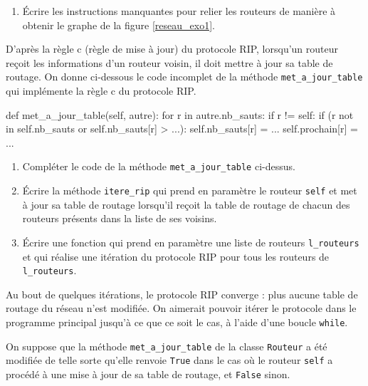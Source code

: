         \begin{enumerate}[series=monDS, resume]
\item Écrire les instructions manquantes pour relier les routeurs de manière à obtenir le graphe de la figure \ref{reseau_exo1}.



\end{enumerate}

D’après la règle c (règle de mise à jour) du protocole RIP, lorsqu’un routeur reçoit les informations d’un routeur voisin, il doit mettre à jour sa table de routage. On donne ci-dessous le code incomplet de la méthode \verb|met_a_jour_table| qui implémente la règle c du protocole RIP.

    \begin{CodePythontexAlt}[TaillePolice=\large, Largeur=1\linewidth,Centre,Lignes=true,PremLigne=1]{}
def met_a_jour_table(self, autre): 
    for r in autre.nb_sauts: 
        if r != self: 
            if (r not in self.nb_sauts or self.nb_sauts[r] > ...): 
                self.nb_sauts[r] = ... 
                self.prochain[r] = ...
\end{CodePythontexAlt}

\begin{enumerate}[series=monDS, resume]
    \item Compléter le code de la méthode \verb|met_a_jour_table| ci-dessus.
    
\medskip
    \item Écrire la méthode \verb|itere_rip| qui prend en paramètre le routeur \verb|self| et met à jour sa table de routage lorsqu’il reçoit la table de routage de chacun des routeurs présents dans la liste de ses voisins.

    \medskip
    \item Écrire une fonction qui prend en paramètre une liste de routeurs \verb|l_routeurs| et qui réalise une itération du protocole RIP pour tous les routeurs de \verb|l_routeurs|.


\end{enumerate}

Au bout de quelques itérations, le protocole RIP converge : plus aucune table de routage du réseau n’est modifiée. On aimerait pouvoir itérer le protocole dans le programme principal jusqu’à ce que ce soit le cas, à l’aide d’une boucle \verb|while|.\par

On suppose que la méthode \verb|met_a_jour_table| de la classe \verb|Routeur| a été modifiée de telle sorte qu’elle renvoie \verb|True| dans le cas où le routeur \verb|self| a procédé à une mise à jour de sa table de routage, et \verb|False| sinon.



